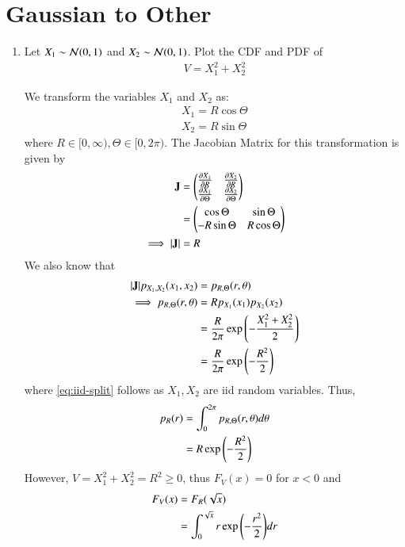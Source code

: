 \documentclass[journal,12pt,twocolumn]{IEEEtran}
\renewcommand\thesection{\arabic{section}}
\begin{document}
\section{Gaussian to Other}
\begin{enumerate}[label=\thesection.\arabic*
,ref=\thesection.\theenumi]
\item Let $X_1 \sim \mathcal{N}(0, 1)$ and $X_2 \sim \mathcal{N}(0, 1)$. Plot the CDF and PDF of
	\begin{align}
		V = X_1^2 + X_2^2
	\end{align}

\solution
We transform the variables $X_1$ and $X_2$ as:
		\begin{align}
			X_1 = R\cos{\Theta} \\
			X_2 = R\sin{\Theta}
		\end{align}
where $R \in [0, \infty), \Theta \in [0, 2\pi)$. The Jacobian Matrix for this transformation is given by
		\begin{align}
			\mathbf{J} &= \begin{pmatrix}\frac{\partial X_1}{\partial R} & \frac{\partial X_2}{\partial R} \\
							 \frac{\partial X_1}{\partial \Theta} & \frac{\partial X_2}{\partial \Theta}\end{pmatrix} \\
					&= \begin{pmatrix}\cos{\Theta} & \sin{\Theta} \\
							  -R\sin{\Theta} & R\cos{\Theta}\end{pmatrix} \\
			\implies |\mathbf{J}| &= R
			\label{eq:Jacobian}
		\end{align}
We also know that
		\begin{align}
			|\mathbf{J}|p_{X_1, X_2}(x_1, x_2) &= p_{R, \Theta}(r, \theta) \\
			\implies p_{R, \Theta}(r, \theta) &= Rp_{X_1}(x_1)p_{X_2}(x_2) \label{eq:iid-split} \\
			&= \frac{R}{2\pi}\exp{\ensuremath{\left(-\frac{X_1^2 + X_2^2}{2}\right)}} \\
			&= \frac{R}{2\pi}\exp{\ensuremath{\left(-\frac{R^2}{2}\right)}}
			\label{eq:joint}
		\end{align}
where \eqref{eq:iid-split} follows as $X_1, X_2$ are iid random variables. Thus,
		\begin{align}
			p_R(r) &= \int_{0}^{2\pi}p_{R, \Theta}(r, \theta)d\theta \\
			&= R\exp{\ensuremath{\left(-\frac{R^2}{2}\right)}}
		\end{align}
However, $V = X_1^2 + X_2^2 = R^2 \geq 0$, thus $F_V(x) = 0$ for $x < 0$ and
		\begin{align}
			F_V(x) &= F_R(\sqrt{x}) \\ 
			&= \int_{0}^{\sqrt{x}}r\exp{\brak{-\frac{r^2}{2}}}dr \\

\end{align}
\end{enumerate}
\end{document}
